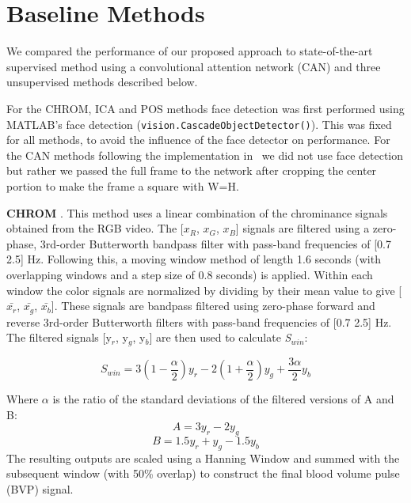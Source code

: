 \documentclass{article}
\begin{document}
\section{Baseline Methods}
We compared the performance of our proposed approach to state-of-the-art supervised method using a convolutional attention network (CAN) and three unsupervised methods described below.

For the CHROM, ICA and POS methods face detection was first performed using MATLAB's face detection (\texttt{vision.CascadeObjectDetector()}). This was fixed for all methods, to avoid the influence of the face detector on performance. For the CAN methods following the implementation in~\cite{chen2018deepphys} we did not use face detection but rather we passed the full frame to the network after cropping the center portion to make the frame a square with W=H.

\textbf{CHROM} \citep{de2013robust}. This method uses a linear combination of the chrominance signals obtained from the RGB video.  The [\begin{math}x_R\end{math}, \begin{math}x_G\end{math}, \begin{math}x_B\end{math}] signals are filtered using a zero-phase, 3rd-order Butterworth bandpass filter with pass-band frequencies of [0.7 2.5] Hz. Following this, a moving window method of length 1.6 seconds (with overlapping windows and a step size of 0.8 seconds) is applied. Within each window the color signals are normalized by dividing by their mean value to give [\begin{math}\bar{x_r}\end{math}, \begin{math}\bar{x_g}\end{math}, \begin{math}\bar{x_b}\end{math}]. These signals are bandpass filtered using zero-phase forward and reverse 3rd-order Butterworth filters with pass-band frequencies of [0.7 2.5] Hz. The filtered signals [y$_{r}$, y$_{g}$, y$_{b}$] are then used to calculate \textit{S$_{win}$}:

\begin{equation}
S_{win} = 3( 1 - \frac{\alpha}{2} )y_{r} - 2(1 + \frac{\alpha}{2})y_{g} + \frac{3\alpha}{2}y_{b}
\end{equation}

Where $\alpha$ is the ratio of the standard deviations of the filtered versions of A and B:
\begin{equation}
    A = 3y_r - 2y_g
\end{equation}
\begin{equation}
B = 1.5y_r + y_g - 1.5y_b
\end{equation}
The resulting outputs are scaled using a Hanning Window and summed with the subsequent window (with 50\% overlap) to construct the final blood volume pulse (BVP) signal.
\end{document}

